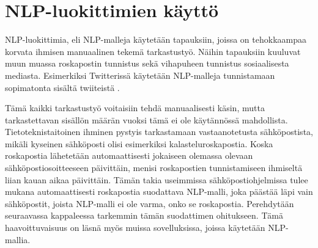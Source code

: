 \chapter{NLP-luokittimien käyttö\label{methods}}

NLP-luokittimia, eli NLP-malleja käytetään tapauksiin, joissa on tehokkaampaa korvata ihmisen manuaalinen tekemä tarkastustyö. Näihin tapauksiin kuuluvat muun muassa roskapostin tunnistus sekä vihapuheen tunnistus sosiaalisesta mediasta. Esimerkiksi Twitterissä käytetään NLP-malleja tunnistamaan sopimatonta sisältä twiiteistä \citep{twitternlp}.

Tämä kaikki tarkastustyö voitaisiin tehdä manuaalisesti käsin, mutta tarkastettavan sisällön määrän vuoksi tämä ei ole käytännössä mahdollista. Tietoteknistaitoinen ihminen pystyis tarkastamaan vastaanotetusta sähköpostista, mikäli kyseinen sähköposti olisi esimerkiksi kalasteluroskapostia. Koska roskapostia lähetetään automaattisesti jokaiseen olemassa olevaan sähköpostiosoitteeseen päivittäin, menisi roskapostien tunnistamiseen ihmiseltä liian kauan aikaa päivittäin. Tämän takia useimmissa sähköpostiohjelmissa tulee mukana automaattisesti roskapostia suodattava NLP-malli, joka päästää läpi vain sähköpostit, joista NLP-malli ei ole varma, onko se roskapostia. Perehdytään seuraavassa kappaleessa tarkemmin tämän suodattimen ohitukseen. Tämä haavoittuvaisuus on läsnä myös muissa sovelluksissa, joissa käytetään NLP-mallia.